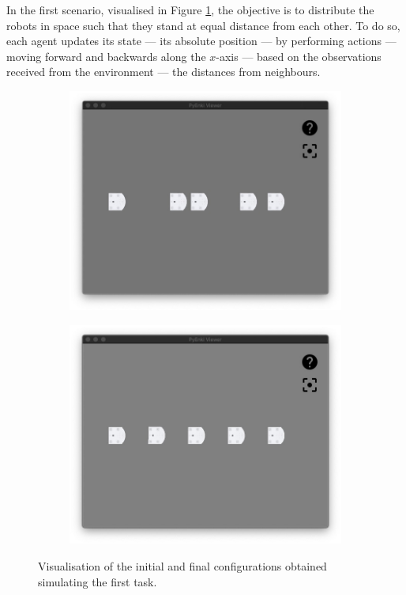 In the first scenario, visualised in Figure \ref{fig:task1}, the objective is to 
distribute the robots in space such that they stand at equal distance from each 
other. To do so, each agent updates its state — its absolute position — by 
performing actions — moving forward and backwards along the $x$-axis — 
based on the observations received from the environment — the distances from 
neighbours.
\begin{figure}[!htb]
	\begin{center}
		\begin{subfigure}[h]{0.49\textwidth}
		\centering
		\includegraphics[width=\textwidth]{contents/images/task1init}
		\end{subfigure}
		\hfill
		\begin{subfigure}[h]{0.49\textwidth}
			\centering
			\includegraphics[width=\textwidth]{contents/images/task1final}
		\end{subfigure}
	\end{center}
	\vspace{-0.5cm}
	\caption[Visualisation of the simulation of the first task.]{Visualisation of the 
	initial and final configurations obtained simulating the first task.}
	\label{fig:task1}
\end{figure}
